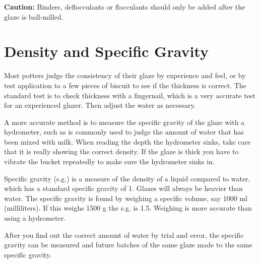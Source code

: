 \textbf{Caution:} Binders, deflocculants or flocculants should only be added 
after the glaze is ball-milled.
\section{Density and Specific Gravity}
Most potters judge the consistency of their glaze by experience and feel, or by 
test application to a few pieces of biscuit to see if the thickness is correct. 
The standard test is to check thickness with a fingernail, which is a very 
accurate test for an experienced glazer. Then adjust the water as necessary.

A more accurate method is to measure the specific gravity of the glaze with a 
hydrometer, such as is commonly used to judge the amount of water that has been 
mixed with milk. When reading the depth the hydrometer sinks, take care that it 
is really showing the correct density. If the glaze is thick you have to 
vibrate the bucket repeatedly to make sure the hydrometer sinks in.

Specific gravity (s.g.) is a measure of the density of a liquid compared to 
water, which has a standard specific gravity of 1. Glazes will always be 
heavier than water. The specific gravity is found by weighing a specific 
volume, say 1000 ml (milliliters). If this weighs 1500 g the s.g. is 1.5. 
Weighing is more accurate than using a hydrometer.

After you find out the correct amount of water by trial and error, the specific 
gravity can be measured and future batches of the same glaze made to the same 
specific gravity.

